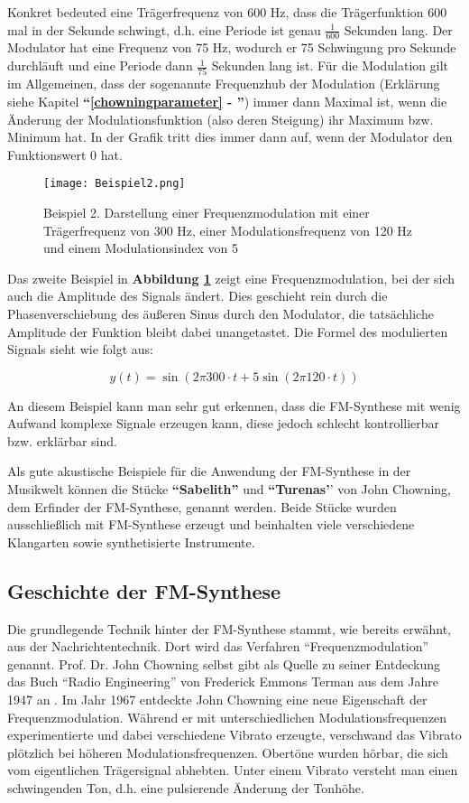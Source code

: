 Konkret bedeuted eine Trägerfrequenz von 600 Hz, dass die Trägerfunktion 600 mal in der Sekunde schwingt, d.h. eine Periode ist genau $\frac{1}{600}$ Sekunden lang. Der Modulator hat eine Frequenz von 75 Hz, wodurch er 75 Schwingung pro Sekunde durchläuft und eine Periode dann $\frac{1}{75}$ Sekunden lang ist. Für die Modulation gilt im Allgemeinen, dass der sogenannte Frequenzhub der Modulation (Erklärung siehe Kapitel \textbf{``\ref{chowningparameter} - ''}) immer dann Maximal ist, wenn die Änderung der Modulationsfunktion (also deren Steigung) ihr Maximum bzw. Minimum hat. In der Grafik tritt dies immer dann auf, wenn der Modulator den Funktionswert 0 hat.

\begin{figure} [ht]
\centering
  \texttt{[image: Beispiel2.png]}
\caption{Beispiel 2. Darstellung einer Frequenzmodulation mit einer Trägerfrequenz von 300 Hz, einer Modulationsfrequenz von 120 Hz und einem Modulationsindex von 5}
\label{fig:beispiel2}
\end{figure}

Das zweite Beispiel in \textbf{Abbildung \ref{fig:beispiel2}} zeigt eine Frequenzmodulation, bei der sich auch die Amplitude des Signals ändert. Dies geschieht rein durch die Phasenverschiebung des äußeren Sinus durch den Modulator, die tatsächliche Amplitude der Funktion bleibt dabei unangetastet. Die Formel des modulierten Signals sieht wie folgt aus:

\[
y(t) = \sin(2 \pi 300\cdot t + 5 \sin(2 \pi 120\cdot t))
\]

An diesem Beispiel kann man sehr gut erkennen, dass die FM-Synthese mit wenig Aufwand komplexe Signale erzeugen kann, diese jedoch schlecht kontrollierbar bzw. erklärbar sind.

Als gute akustische Beispiele für die Anwendung der FM-Synthese in der Musikwelt können die Stücke \textbf{``Sabelith''} und \textbf{``Turenas'}' von John Chowning, dem Erfinder der FM-Synthese, genannt werden. Beide Stücke wurden ausschließlich mit FM-Synthese erzeugt und beinhalten viele verschiedene Klangarten sowie synthetisierte Instrumente.

\FloatBarrier
\subsection{Geschichte der FM-Synthese}
\label{geschichteFMSynthese}
Die grundlegende Technik hinter der FM-Synthese stammt, wie bereits erwähnt, aus der Nachrichtentechnik. Dort wird das Verfahren ``Frequenzmodulation'' genannt. Prof. Dr. John Chowning selbst gibt als Quelle zu seiner Entdeckung das Buch ``Radio Engineering'' von Frederick Emmons Terman aus dem Jahre 1947 an \cite[S. 35]{soundofinnovation}. Im Jahr 1967 entdeckte John Chowning eine neue Eigenschaft der Frequenzmodulation. Während er mit unterschiedlichen Modulationsfrequenzen experimentierte und dabei verschiedene Vibrato erzeugte, verschwand das Vibrato plötzlich bei höheren Modulationsfrequenzen. Obertöne wurden hörbar, die sich vom eigentlichen Trägersignal abhebten. Unter einem Vibrato versteht man einen schwingenden Ton, d.h. eine pulsierende Änderung der Tonhöhe.\cite{fatherofdigitalmusik}

